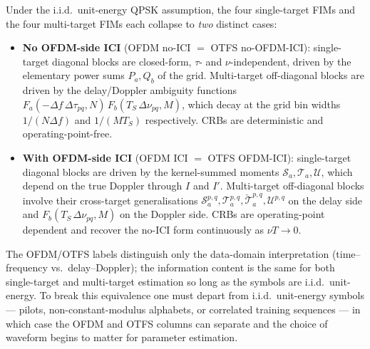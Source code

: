 \documentclass[11pt]{article}
\begin{document}
Under the i.i.d.\ unit-energy QPSK assumption, the four single-target
FIMs and the four multi-target FIMs each collapse to \emph{two}
distinct cases:
\begin{itemize}
    \item \textbf{No OFDM-side ICI} (OFDM no-ICI \(=\) OTFS no-OFDM-ICI):
          single-target diagonal blocks are closed-form,
          \(\tau\)- and \(\nu\)-independent, driven by the elementary
          power sums \(P_a, Q_b\) of the grid. Multi-target
          off-diagonal blocks are driven by the delay/Doppler
          ambiguity functions
          \(F_a(-\Delta f\,\Delta\tau_{pq},N)\,F_b(T_S\,\Delta\nu_{pq},M)\),
          which decay at the grid bin widths
          \(1/(N\Delta f)\) and \(1/(MT_S)\) respectively. CRBs are
          deterministic and operating-point-free.
    \item \textbf{With OFDM-side ICI} (OFDM ICI \(=\) OTFS OFDM-ICI):
          single-target diagonal blocks are driven by the
          kernel-summed moments \(\mathcal{S}_a, \mathcal{T}_a,
          \mathcal{U}\), which depend on the true Doppler through
          \(I\) and \(I'\). Multi-target off-diagonal blocks involve
          their cross-target generalisations
          \(\mathcal{S}_a^{p,q}, \mathcal{T}_a^{p,q},
          \check{\mathcal{T}}_a^{p,q}, \mathcal{U}^{p,q}\) on the
          delay side and \(F_b(T_S\,\Delta\nu_{pq},M)\) on the Doppler
          side. CRBs are operating-point dependent and recover the
          no-ICI form continuously as \(\nu T\to 0\).
\end{itemize}
The OFDM/OTFS labels distinguish only the data-domain interpretation
(time--frequency vs.\ delay--Doppler); the information content is the
same for both single-target and multi-target estimation so long as the
symbols are i.i.d.\ unit-energy. To break this equivalence one must
depart from i.i.d.\ unit-energy symbols --- pilots, non-constant-modulus
alphabets, or correlated training sequences --- in which case the OFDM
and OTFS columns can separate and the choice of waveform begins to
matter for parameter estimation.
\end{document}
